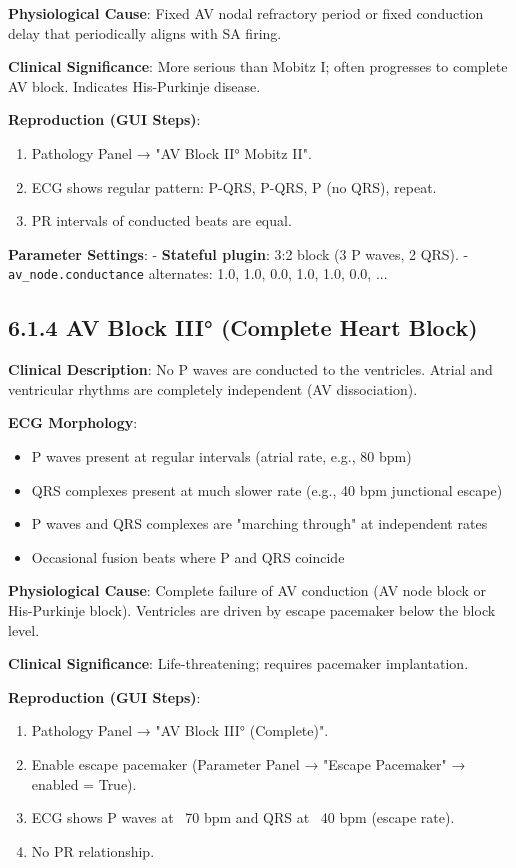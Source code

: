 \documentclass[12pt,oneside,a4paper]{book}
\newcommand{\code}[1]{\texttt{#1}}
\begin{document}
\textbf{Physiological Cause}:
Fixed AV nodal refractory period or fixed conduction delay that periodically aligns with SA firing.

\textbf{Clinical Significance}:
More serious than Mobitz I; often progresses to complete AV block. Indicates His-Purkinje disease.

\textbf{Reproduction (GUI Steps)}:
\begin{enumerate}
  \item Pathology Panel → "AV Block II° Mobitz II".
  \item ECG shows regular pattern: P-QRS, P-QRS, P (no QRS), repeat.
  \item PR intervals of conducted beats are equal.
\end{enumerate}

\textbf{Parameter Settings}:
- \textbf{Stateful plugin}: 3:2 block (3 P waves, 2 QRS).
- \code{av\_node.conductance} alternates: 1.0, 1.0, 0.0, 1.0, 1.0, 0.0, ...

\subsection{6.1.4 AV Block III° (Complete Heart Block)}

\textbf{Clinical Description}:
No P waves are conducted to the ventricles. Atrial and ventricular rhythms are completely independent (AV dissociation).

\textbf{ECG Morphology}:
\begin{itemize}
  \item P waves present at regular intervals (atrial rate, e.g., 80 bpm)
  \item QRS complexes present at much slower rate (e.g., 40 bpm junctional escape)
  \item P waves and QRS complexes are "marching through" at independent rates
  \item Occasional fusion beats where P and QRS coincide
\end{itemize}

\textbf{Physiological Cause}:
Complete failure of AV conduction (AV node block or His-Purkinje block). Ventricles are driven by escape pacemaker below the block level.

\textbf{Clinical Significance}:
Life-threatening; requires pacemaker implantation.

\textbf{Reproduction (GUI Steps)}:
\begin{enumerate}
  \item Pathology Panel → "AV Block III° (Complete)".
  \item Enable escape pacemaker (Parameter Panel → "Escape Pacemaker" → enabled = True).
  \item ECG shows P waves at ~70 bpm and QRS at ~40 bpm (escape rate).
  \item No PR relationship.
\end{enumerate}
\end{document}
